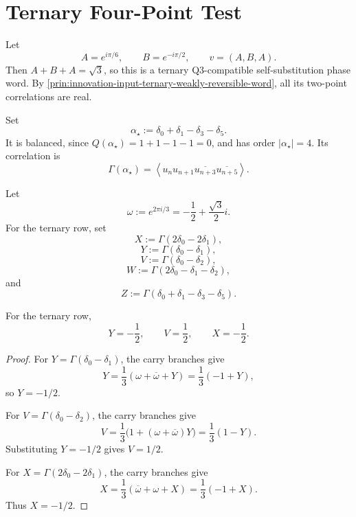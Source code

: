 \section{Ternary Four-Point Test}
\label{sec:innovation-input-ternary-four-point-test}

\begin{definition}
\label{def:innovation-input-ternary-qthree-row}
Let
$$
A=e^{i\pi/6},
\qquad
B=e^{-i\pi/2},
\qquad
v=(A,B,A).
$$
Then $A+B+A=\sqrt3$, so this is a ternary Q3-compatible
self-substitution phase word. By
\autoref{prin:innovation-input-ternary-weakly-reversible-word}, all its
two-point correlations are real.
\end{definition}

\begin{definition}
\label{def:innovation-input-four-point-test-block}
Set
$$
\alpha_\star:=\delta_0+\delta_1-\delta_3-\delta_5.
$$
It is balanced, since $Q(\alpha_\star)=1+1-1-1=0$, and has order
$|\alpha_\star|=4$. Its correlation is
$$
\Gamma(\alpha_\star)
=
\left\langle
u_nu_{n+1}\overline{u_{n+3}}\overline{u_{n+5}}
\right\rangle.
$$
\end{definition}

\begin{definition}
\label{def:innovation-input-ternary-auxiliary-correlations}
Let
$$
\omega:=e^{2\pi i/3}
=
-\frac12+\frac{\sqrt3}{2}i.
$$
For the ternary row, set
$$
X:=\Gamma(2\delta_0-2\delta_1),
$$
$$
Y:=\Gamma(\delta_0-\delta_1),
$$
$$
V:=\Gamma(\delta_0-\delta_2),
$$
$$
W:=\Gamma(2\delta_0-\delta_1-\delta_2),
$$
and
$$
Z:=\Gamma(\delta_0+\delta_1-\delta_3-\delta_5).
$$
\end{definition}

\begin{lemma}
\label{lem:innovation-input-ternary-two-point-auxiliary-values}
For the ternary row,
$$
Y=-\frac12,
\qquad
V=\frac12,
\qquad
X=-\frac12.
$$
\end{lemma}

\begin{proof}
For $Y=\Gamma(\delta_0-\delta_1)$, the carry branches give
$$
Y=\frac13(\omega+\overline\omega+Y)
=
\frac13(-1+Y),
$$
so $Y=-1/2$.

For $V=\Gamma(\delta_0-\delta_2)$, the carry branches give
$$
V=\frac13\bigl(1+(\omega+\overline\omega)Y\bigr)
=
\frac13(1-Y).
$$
Substituting $Y=-1/2$ gives $V=1/2$.

For $X=\Gamma(2\delta_0-2\delta_1)$, the carry branches give
$$
X=\frac13(\overline\omega+\omega+X)
=
\frac13(-1+X).
$$
Thus $X=-1/2$.
\end{proof}

